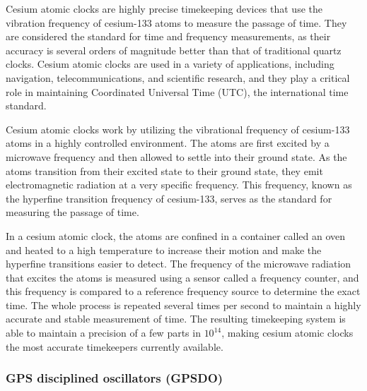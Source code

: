 Cesium atomic clocks are highly precise timekeeping devices that use the vibration frequency of cesium-133 atoms to measure the passage of time. They are considered the standard for time and frequency measurements, as their accuracy is several orders of magnitude better than that of traditional quartz clocks. Cesium atomic clocks are used in a variety of applications, including navigation, telecommunications, and scientific research, and they play a critical role in maintaining Coordinated Universal Time (UTC), the international time standard.

Cesium atomic clocks work by utilizing the vibrational frequency of cesium-133 atoms in a highly controlled environment. The atoms are first excited by a microwave frequency and then allowed to settle into their ground state. As the atoms transition from their excited state to their ground state, they emit electromagnetic radiation at a very specific frequency. This frequency, known as the hyperfine transition frequency of cesium-133, serves as the standard for measuring the passage of time.

In a cesium atomic clock, the atoms are confined in a container called an oven and heated to a high temperature to increase their motion and make the hyperfine transitions easier to detect. The frequency of the microwave radiation that excites the atoms is measured using a sensor called a frequency counter, and this frequency is compared to a reference frequency source to determine the exact time. The whole process is repeated several times per second to maintain a highly accurate and stable measurement of time. The resulting timekeeping system is able to maintain a precision of a few parts in $10^{14}$, making cesium atomic clocks the most accurate timekeepers currently available.



\subsubsection{GPS disciplined oscillators (GPSDO)}



